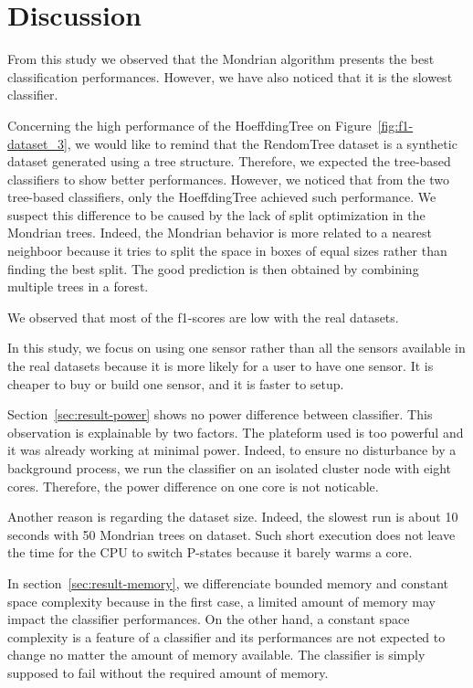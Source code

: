 \section{Discussion}
From this study we observed that the Mondrian algorithm presents the best
classification performances.  However, we have also noticed that it is the
slowest classifier.

Concerning the high performance of the HoeffdingTree on
Figure~\ref{fig:f1-dataset_3}, we would like to remind that the RendomTree
dataset is a synthetic dataset generated using a tree structure. Therefore, we
expected the tree-based classifiers to show better performances.  However, we
noticed that from the two tree-based classifiers, only the HoeffdingTree
achieved such performance.  We suspect this difference to be caused by the lack
of split optimization in the Mondrian trees. Indeed, the Mondrian behavior is
more related to a nearest neighboor because it tries to split the space in
boxes of equal sizes rather than finding the best split. The good prediction is
then obtained by combining multiple trees in a forest.


We observed that most of the f1-scores are low with the real datasets.

In this study, we focus on using one sensor rather than all the sensors
available in the real datasets because it is more likely for a user to have one
sensor. It is cheaper to buy or build one sensor, and it is faster to setup.


Section~\ref{sec:result-power} shows no power difference between classifier. This
observation is explainable by two factors. The plateform used is too powerful
and it was already working at minimal power. Indeed, to ensure no disturbance
by a background process, we run the classifier on an isolated cluster node with
eight cores. Therefore, the power difference on one core is not noticable.

Another reason is regarding the dataset size. Indeed, the slowest run is about
10 seconds with 50 Mondrian trees on \recofitdataset dataset.  Such short
execution does not leave the time for the CPU to switch P-states because it
barely warms a core.

In section~\ref{sec:result-memory}, we differenciate bounded memory and
constant space complexity because in the first case, a limited amount of memory
may impact the classifier performances. On the other hand, a constant space
complexity is a feature of a classifier and its performances are not expected
to change no  matter the amount of memory available. The classifier is simply
supposed to fail without the required amount of memory.







